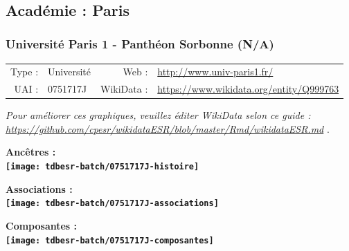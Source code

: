 \documentclass[12pt,french,]{article}
\begin{document}
\ifoddpage \fi ~\newpage  

\hypertarget{acaduxe9mie-paris}{%
\subsection{Académie : Paris}\label{acaduxe9mie-paris}}

\hypertarget{universituxe9-paris-1---panthuxe9on-sorbonne-na}{%
\subsubsection{Université Paris 1 - Panthéon Sorbonne
(N/A)}\label{universituxe9-paris-1---panthuxe9on-sorbonne-na}}

\begin{tabular*}{\textwidth}{rp{5cm}rl}  
\hline  
Type : & Université & Web : &\href{http://www.univ-paris1.fr/}{http://www.univ-paris1.fr/} \\  
UAI : & 0751717J & WikiData : & \href{https://www.wikidata.org/entity/Q999763}{https://www.wikidata.org/entity/Q999763} \\  
\hline  
\end{tabular*}

\textit{\scriptsize Pour améliorer ces graphiques, veuillez éditer WikiData selon ce guide :  \href{https://github.com/cpesr/wikidataESR/blob/master/Rmd/wikidataESR.md}{https://github.com/cpesr/wikidataESR/blob/master/Rmd/wikidataESR.md}}
.

\vspace{1cm}  
\begin{minipage}[b]{0.50\textwidth}\begin{center} \bf Ancêtres : \\  
\texttt{[image: tdbesr-batch/0751717J-histoire]} \end{center}\end{minipage}\begin{minipage}[b]{0.50\textwidth}\begin{center} \bf Associations : \\  
\texttt{[image: tdbesr-batch/0751717J-associations]} \end{center}\end{minipage}

\hrulefill

\begin{center} \bf Composantes : \\  
\texttt{[image: tdbesr-batch/0751717J-composantes]} \end{center}
\end{document}
